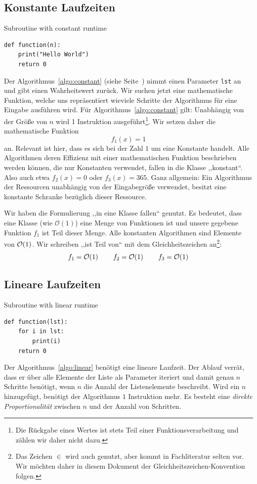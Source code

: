\subsection{Konstante Laufzeiten}
%
\begin{algorithm}[p]
\caption{Subroutine with constant runtime}
\label{algo:constant}
\begin{lstlisting}
def function(n):
    print("Hello World")
    return 0
\end{lstlisting}
\end{algorithm}
%
Der Algorithmus~\ref{algo:constant} (siehe Seite~\pageref{algo:constant}) nimmt einen Parameter \texttt{lst} an und gibt einen Wahrheitswert zurück. Wir suchen jetzt eine mathematische Funktion, welche uns repräsentiert wieviele Schritte der Algorithmus für eine Eingabe ausführen wird. Für Algorithmus~\ref{algo:constant} gilt: Unabhängig von der Größe von $n$ wird 1 Instruktion ausgeführt\footnote{Die Rückgabe eines Wertes ist stets Teil einer Funktionsverarbeitung und zählen wir daher nicht dazu.}. Wir setzen daher die mathematische Funktion
\[
  f_1(x) = 1
\]
an. Relevant ist hier, dass es sich bei der Zahl $1$ um eine Konstante handelt. Alle Algorithmen deren Effizienz mit einer mathematischen Funktion beschrieben werden können, die nur Konstanten verwendet, fallen in die Klasse ,,konstant``. Also auch etwa $f_2(x) = 0$ oder $f_3(x) = 365$. Ganz allgemein: Ein Algorithmus der Ressourcen unabhängig von der Eingabegröße verwendet, besitzt eine konstante Schranke bezüglich dieser Ressource.

Wir haben die Formulierung ,,in eine Klasse fallen`` genutzt. Es bedeutet, dass eine Klasse (wie $\mathcal{O}(1)$) eine Menge von Funktionen ist und unsere gegebene Funktion $f_1$ ist Teil dieser Menge. Alle konstanten Algorithmen sind Elemente von $\mathcal{O}\!\left(1\right)$. Wir schreiben ,,ist Teil von`` mit dem Gleichheitszeichen an\footnote{Das Zeichen $\in$ wird auch genutzt, aber kommt in Fachliteratur selten vor. Wir möchten daher in diesem Dokument der Gleichheitszeichen-Konvention folgen.}:
\[
    f_1 = \mathcal{O}\!\left(1\right) \qquad f_2 = \mathcal{O}\!\left(1\right) \qquad f_3 = \mathcal{O}\!\left(1\right)
\]
%
\subsection{Lineare Laufzeiten}
%
\begin{algorithm}[p]
\caption{Subroutine with linear runtime}
\label{algo:linear}
\begin{lstlisting}
def function(lst):
    for i in lst:
        print(i)
    return 0
\end{lstlisting}
\end{algorithm}
%
Der Algorithmus~\ref{algo:linear} benötigt eine lineare Laufzeit. Der Ablauf verrät, dass er über alle Elemente der Liste als Parameter iteriert und damit genau $n$ Schritte benötigt, wenn $n$ die Anzahl der Listenelemente beschreibt. Wird ein $n$ hinzugefügt, benötigt der Algorithmus $1$ Instruktion mehr. Es besteht eine \emph{direkte Proportionalität} zwischen $n$ und der Anzahl von Schritten.

